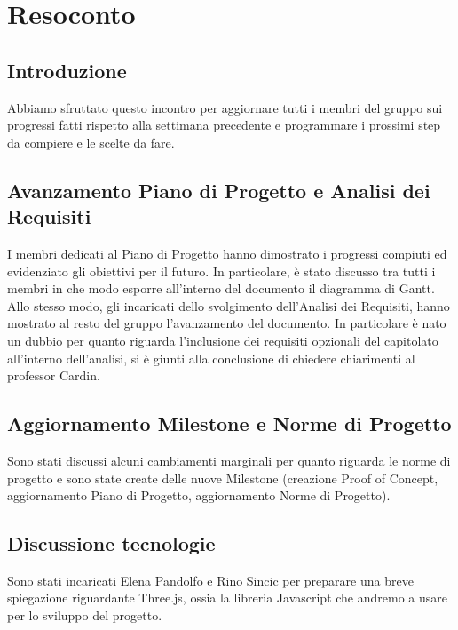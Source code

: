 \section{Resoconto}
\subsection{Introduzione}
Abbiamo sfruttato questo incontro per aggiornare tutti i membri del gruppo sui progressi fatti rispetto alla settimana precedente e programmare i prossimi step da compiere e le scelte da fare.

\subsection{Avanzamento Piano di Progetto e Analisi dei Requisiti}
I membri dedicati al Piano di Progetto hanno dimostrato i progressi compiuti ed evidenziato gli obiettivi per il futuro. In particolare, è stato discusso tra tutti i membri in che modo esporre all'interno del documento il diagramma di Gantt.\\Allo stesso modo, gli incaricati dello svolgimento dell'Analisi dei Requisiti, hanno mostrato al resto del gruppo l'avanzamento del documento. In particolare è nato un dubbio per quanto riguarda l'inclusione dei requisiti opzionali del capitolato all'interno dell'analisi, si è giunti alla conclusione di chiedere chiarimenti al professor Cardin.  


\subsection{Aggiornamento Milestone e Norme di Progetto}
Sono stati discussi alcuni cambiamenti marginali per quanto riguarda le norme di progetto e sono state create delle nuove Milestone (creazione Proof of Concept, aggiornamento Piano di Progetto, aggiornamento Norme di Progetto).

\subsection{Discussione tecnologie}
Sono stati incaricati Elena Pandolfo e Rino Sincic per preparare una breve spiegazione riguardante Three.js, ossia la libreria Javascript che andremo a usare per lo sviluppo del progetto.
